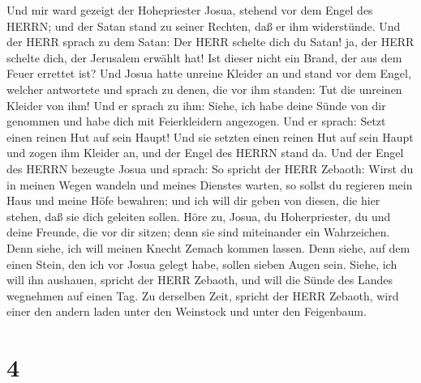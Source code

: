  Und mir ward gezeigt der Hohepriester Josua, stehend vor
dem Engel des HERRN; und der Satan stand zu seiner Rechten, daß er ihm
widerstünde.  Und der HERR sprach zu dem Satan: Der HERR
schelte dich du Satan! ja, der HERR schelte dich, der Jerusalem erwählt
hat! Ist dieser nicht ein Brand, der aus dem Feuer errettet ist?
 Und Josua hatte unreine Kleider an und stand vor dem Engel,
 welcher antwortete und sprach zu denen, die vor ihm
standen: Tut die unreinen Kleider von ihm! Und er sprach zu ihm: Siehe,
ich habe deine Sünde von dir genommen und habe dich mit Feierkleidern
angezogen.  Und er sprach: Setzt einen reinen Hut auf sein
Haupt! Und sie setzten einen reinen Hut auf sein Haupt und zogen ihm
Kleider an, und der Engel des HERRN stand da.  Und der Engel
des HERRN bezeugte Josua und sprach:  So spricht der HERR
Zebaoth: Wirst du in meinen Wegen wandeln und meines Dienstes warten, so
sollst du regieren mein Haus und meine Höfe bewahren; und ich will dir
geben von diesen, die hier stehen, daß sie dich geleiten sollen.
 Höre zu, Josua, du Hoherpriester, du und deine Freunde, die
vor dir sitzen; denn sie sind miteinander ein Wahrzeichen. Denn siehe,
ich will meinen Knecht Zemach kommen lassen.  Denn siehe,
auf dem einen Stein, den ich vor Josua gelegt habe, sollen sieben Augen
sein. Siehe, ich will ihn aushauen, spricht der HERR Zebaoth, und will
die Sünde des Landes wegnehmen auf einen Tag.  Zu derselben
Zeit, spricht der HERR Zebaoth, wird einer den andern laden unter den
Weinstock und unter den Feigenbaum.

\hypertarget{section-3}{%
\section{4}\label{section-3}}

